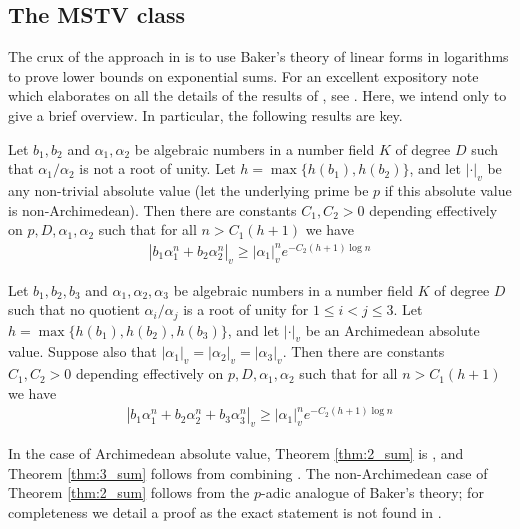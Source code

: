 \documentclass{theoretics}
\begin{document}
\subsection{The MSTV class}
The crux of the approach in \cite{Mignotte_distance,Vereshchagin} is to use Baker's theory of linear forms in logarithms to prove lower bounds on exponential sums. For an excellent expository note which elaborates on all the details of the results of \cite{Mignotte_distance,Vereshchagin}, see \cite{bilu_skolem_2025}. Here, we intend only to give a brief overview. In particular, the following results are key.
\begin{theorem} \label{thm:2_sum}
Let $b_1,b_2$ and $\alpha_1,\alpha_2$ be algebraic numbers in a number field $K$ of degree $D$ such that $\alpha_1/\alpha_2$ is not a root of unity. Let $h = \max\{h(b_1), h(b_2)\}$, and let $|\cdot|_v$ be any non-trivial absolute value (let the underlying prime be $p$ if this absolute value is non-Archimedean). Then there are constants $C_1,C_2 > 0$ depending effectively on $p,D, \alpha_1, \alpha_2$ such that for all $n > C_1 (h+1)$ we have
\begin{align} \label{eqn:2_sum}
    |b_1 \alpha_1^n + b_2 \alpha_2^n|_v \geq |\alpha_1|_v^n e^{-C_2 (h+1) \log n}
\end{align}
\end{theorem}
\begin{theorem} \label{thm:3_sum}
Let $b_1,b_2,b_3$ and $\alpha_1,\alpha_2,\alpha_3$ be algebraic numbers in a number field $K$ of degree $D$ such that no quotient $\alpha_i/\alpha_j$ is a root of unity for $1 \leq i < j \leq 3$. Let $h = \max\{h(b_1), h(b_2),h(b_3)\}$, and let $|\cdot|_v$ be an Archimedean absolute value. Suppose also that $|\alpha_1|_v = |\alpha_2|_v = |\alpha_3|_v$. Then there are constants $C_1,C_2 > 0$ depending effectively on $p,D, \alpha_1, \alpha_2$ such that for all $n > C_1 (h+1)$ we have
\begin{align}
    |b_1 \alpha_1^n + b_2 \alpha_2^n + b_3 \alpha_3^n|_v \geq |\alpha_1|_v^n e^{-C_2 (h+1) \log n}
\end{align}
\end{theorem}
In the case of Archimedean absolute value, Theorem \ref{thm:2_sum} is \cite[Corollary 2]{Mignotte_distance}, and Theorem \ref{thm:3_sum} follows from combining \cite[Theorems 4, 5]{Mignotte_distance}. The non-Archimedean case of Theorem \ref{thm:2_sum} follows from the $p$-adic analogue of Baker's theory; for completeness we detail a proof as the exact statement is not found in \cite{Mignotte_distance}.
\end{document}
